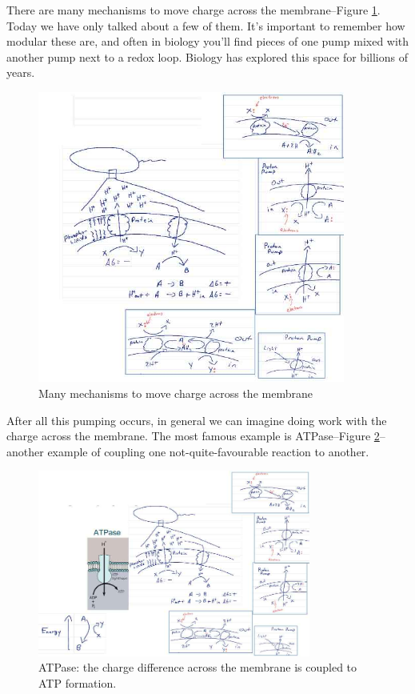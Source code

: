\documentclass[]{article}
\begin{document}
There are many mechanisms to move charge across the membrane--Figure \ref{fig:ManyMechanisms}. Today we have only talked about a few of them.
It's important to remember how modular these are, and often in biology you'll find pieces of one pump mixed with another pump next to a redox loop. Biology has explored this space for billions of years.


\begin{figure}[H]
	\caption{Many mechanisms to move charge across the membrane}\label{fig:ManyMechanisms}
	\includegraphics[width=0.9\textwidth]{ManyMechanisms}
\end{figure}

After all this pumping occurs, in general we can imagine doing work with the charge across the membrane. The most famous example is ATPase--Figure \ref{fig:ATPase}--another example of coupling one not-quite-favourable reaction to another.

\begin{figure}[H]
	\caption[ATPase]{ATPase: the charge difference across the membrane is coupled to ATP formation. }\label{fig:ATPase}
	\includegraphics[width=0.8\textwidth]{ATPase}
\end{figure}
\end{document}
